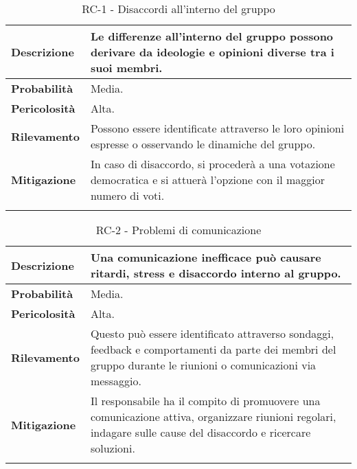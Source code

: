\begin{longtable}{ | l | p{12cm} | }
	\hline
	\textbf{Descrizione}  & Le differenze all'interno del gruppo possono derivare da ideologie e opinioni diverse tra i suoi membri.              \\
	\hline
	\textbf{Probabilità}  & Media.                                                                                                                \\
	\hline
	\textbf{Pericolosità} & Alta.                                                                                                                 \\
	\hline
	\textbf{Rilevamento}  & Possono essere identificate attraverso le loro opinioni espresse o osservando le dinamiche del gruppo.                \\
	\hline
	\textbf{Mitigazione}  & In caso di disaccordo, si procederà a una votazione democratica e si attuerà l'opzione con il maggior numero di voti. \\
	\hline
	\caption{RC-1 - Disaccordi all'interno del gruppo}
	\label{table:8}
\end{longtable}


\begin{longtable}{ | l | p{12cm} | }
	\hline
	\textbf{Descrizione}  & Una comunicazione inefficace può causare ritardi, stress e disaccordo interno al gruppo.                                                                        \\
	\hline
	\textbf{Probabilità}  & Media.                                                                                                                                                          \\
	\hline
	\textbf{Pericolosità} & Alta.                                                                                                                                                           \\
	\hline
	\textbf{Rilevamento}  & Questo può essere identificato attraverso sondaggi, feedback e comportamenti da parte dei membri del gruppo durante le riunioni o comunicazioni via messaggio.  \\
	\hline
	\textbf{Mitigazione}  & Il responsabile ha il compito di promuovere una comunicazione attiva, organizzare riunioni regolari, indagare sulle cause del disaccordo e ricercare soluzioni. \\
	\hline
	\caption{RC-2 - Problemi di comunicazione}
	\label{table:9}
\end{longtable}

